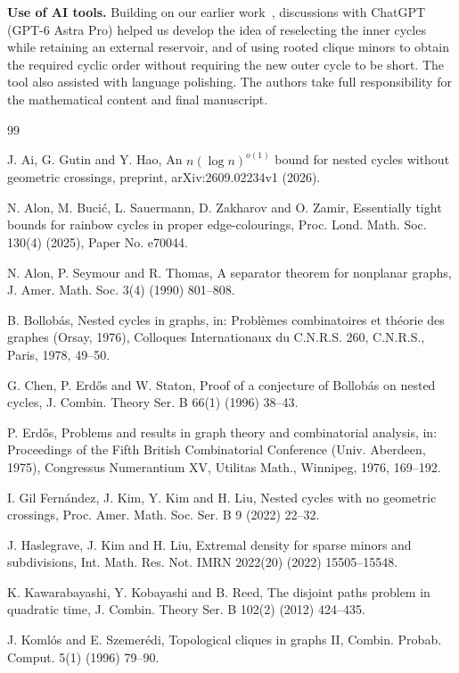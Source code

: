 \documentclass[10pt,letterpaper]{article}
\theoremstyle{definition}
\theoremstyle{remark}
\begin{document}
\smallskip
\noindent\textbf{Use of AI tools.}
Building on our earlier work~\cite{AGH}, discussions with ChatGPT (GPT-6 Astra Pro) helped us develop the idea of reselecting
the inner cycles while retaining an external reservoir, and of using
rooted clique minors to obtain the required cyclic order without requiring the new outer cycle to be short. The tool also assisted
with language polishing. The authors take full responsibility for
the mathematical content and final manuscript.
\begin{thebibliography}{99}

J. Ai, G. Gutin and Y. Hao, An $n(\log n)^{o(1)}$ bound for nested cycles without geometric crossings, preprint, arXiv:2609.02234v1 (2026).

N. Alon, M. Buci\'c, L. Sauermann, D. Zakharov and O. Zamir, Essentially tight bounds for rainbow cycles in proper edge-colourings, Proc. Lond. Math. Soc. 130(4) (2025), Paper No. e70044.

N. Alon, P. Seymour and R. Thomas, A separator theorem for nonplanar graphs, J. Amer. Math. Soc. 3(4) (1990) 801--808.

B. Bollob\'as, Nested cycles in graphs, in: Probl\`emes combinatoires et th\'eorie des graphes (Orsay, 1976), Colloques Internationaux du C.N.R.S. 260, C.N.R.S., Paris, 1978, 49--50.

G. Chen, P. Erd\H{o}s and W. Staton, Proof of a conjecture of Bollob\'as on nested cycles, J. Combin. Theory Ser. B 66(1) (1996) 38--43.

P. Erd\H{o}s, Problems and results in graph theory and combinatorial analysis, in: Proceedings of the Fifth British Combinatorial Conference (Univ. Aberdeen, 1975), Congressus Numerantium XV, Utilitas Math., Winnipeg, 1976, 169--192.

I. Gil Fern\'andez, J. Kim, Y. Kim and H. Liu, Nested cycles with no geometric crossings, Proc. Amer. Math. Soc. Ser. B 9 (2022) 22--32.

J. Haslegrave, J. Kim and H. Liu, Extremal density for sparse minors and subdivisions, Int. Math. Res. Not. IMRN 2022(20) (2022) 15505--15548.

K. Kawarabayashi, Y. Kobayashi and B. Reed, The disjoint paths problem in quadratic time, J. Combin. Theory Ser. B 102(2) (2012) 424--435.

J. Koml\'os and E. Szemer\'edi, Topological cliques in graphs II, Combin. Probab. Comput. 5(1) (1996) 79--90.


\end{thebibliography}
\end{document}

